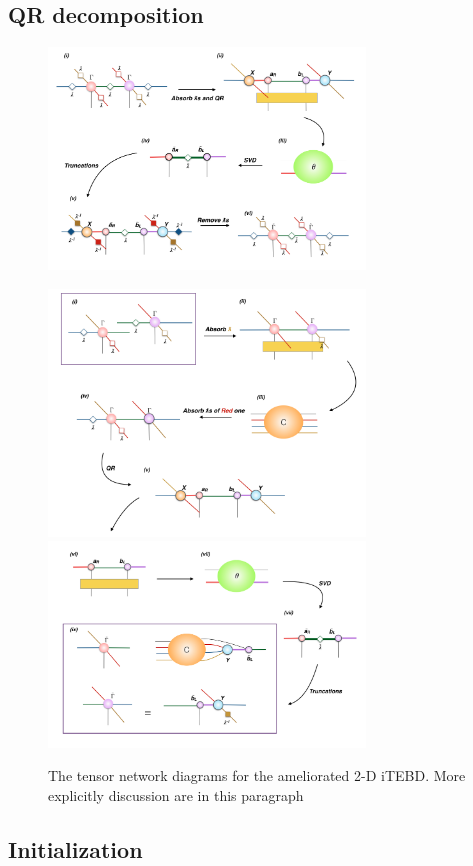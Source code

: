 \subsection{QR decomposition}
\label{2doptQR}
	\begin{figure}[ht]
	\centering
	\includegraphics[width=0.75\textwidth]{figures/fig317.png}
	\caption[The tensor network diagrams for the 2-D iTEBD with QR decomposition]{}
	\label{fig317}
	\end{figure}

	\begin{figure}[ht]
	\centering
	\includegraphics[width=0.75\textwidth]{figures/fig318.png}
	\includegraphics[width=0.75\textwidth]{figures/fig319.png}
	\caption[The tensor network diagrams for the ameliorated 2-D iTEBD with QR decompositiont]{The tensor network diagrams for the ameliorated 2-D iTEBD. More explicitly discussion are in	this paragraph}
	\label{fig318}
	\end{figure}

\subsection{Initialization}
\label{2doptInit}

